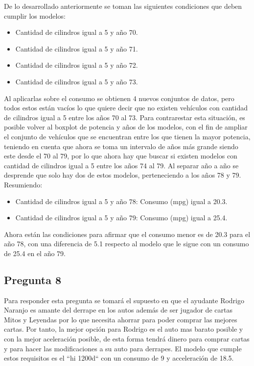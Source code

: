 \documentclass[letter,10pt]{article}
\begin{document}
De lo desarrollado anteriormente se toman las siguientes condiciones que deben cumplir los modelos:
\begin{itemize}
 \item Cantidad de cilindros igual a 5 y año 70.
 \item Cantidad de cilindros igual a 5 y año 71.
 \item Cantidad de cilindros igual a 5 y año 72.
 \item Cantidad de cilindros igual a 5 y año 73.
\end{itemize}

Al aplicarlas sobre el consumo se obtienen 4 nuevos conjuntos de datos, pero todos estos están vacíos lo que quiere decir que no existen vehículos
con cantidad de cilindros igual a 5 entre los años 70 al 73. Para contrarestar esta situación, es posible volver al boxplot de potencia y años de los modelos, 
con el fin de ampliar el conjunto de vehículos que se encuentran entre los que tienen la mayor potencia, teniendo en cuenta que ahora se toma un intervalo de años
más grande siendo este desde el 70 al 79, por lo que ahora hay que buscar si existen modelos con cantidad de cilindros igual a 5 entre los años 74 al 79. Al separar año
a año se desprende que solo hay dos de estos modelos, perteneciendo a los años 78 y 79. Resumiendo:
\begin{itemize}
 \item Cantidad de cilindros igual a 5 y año 78: Consumo (mpg) igual a 20.3.
 \item Cantidad de cilindros igual a 5 y año 79: Consumo (mpg) igual a 25.4.
\end{itemize}

Ahora están las condiciones para afirmar que el consumo menor es de 20.3 para el año 78, con una diferencia de 5.1 respecto al modelo que le sigue
con un consumo de 25.4 en el año 79.


\subsection{Pregunta 8}
Para responder esta pregunta se tomará el supuesto en que el ayudante Rodrigo Naranjo es amante del derrape en los autos además de ser jugador de cartas Mitos y Leyendas
por lo que necesita ahorrar para poder comprar las mejores cartas. Por tanto, la mejor opción para Rodrigo es el auto mas barato posible y con la mejor aceleración posible,
de esta forma tendrá dinero para comprar cartas y para hacer las modificaciones a su auto para derrapes. El modelo que cumple
estos requisitos es el ``hi 1200d`` con un consumo de 9 y acceleración de 18.5.
\end{document}
